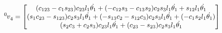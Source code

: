 \documentclass[10pt]{article}
\begin{document}
\[
\tensor*[^{0}]{v}{_4} =
\begin{bmatrix}
(c_{123}-c_{1}s_{23})c_{23}l_1\dot{\theta_{1}} + 
(-c_{12}s_{3}-c_{13}s_{2})c_{2}s_{3}l_1\dot{\theta_{1}} +
s_{12}l_1\dot{\theta_{1}} \\
(s_{1}c_{23}-s_{123})c_{2}s_{3}l_1\dot{\theta_{1}} +
(-s_{13}c_{2}-s_{12}c_{3})c_{2}s_{3}l_1\dot{\theta_{1}} +
(-c_{1}s_{2}l_1\dot{\theta_{1}}) \\
(s_{2}c_{3}+c_{2}s_{3})c_{23}l_1\dot{\theta_{1}} + (c_{23}-s_{23})c_{2}s_{3}l_1\dot{\theta_{1}}
\end{bmatrix}
\]


\end{document}

